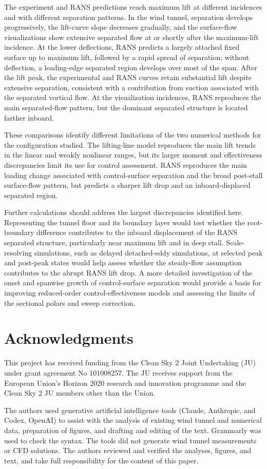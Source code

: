 \documentclass[journal ]{new-aiaa}
\begin{document}
The experiment and RANS predictions reach maximum lift at different incidences and with different separation patterns.
In the wind tunnel, separation develops progressively, the lift-curve slope decreases gradually, and the surface-flow visualizations show extensive separated flow at or shortly after the maximum-lift incidence.
At the lower deflections, RANS predicts a largely attached fixed surface up to maximum lift, followed by a rapid spread of separation; without deflection, a leading-edge separated region develops over most of the span.
After the lift peak, the experimental and RANS curves retain substantial lift despite extensive separation, consistent with a contribution from suction associated with the separated vortical flow.
At the visualization incidences, RANS reproduces the main separated-flow pattern, but the dominant separated structure is located farther inboard.

These comparisons identify different limitations of the two numerical methods for the configuration studied.
The lifting-line model reproduces the main lift trends in the linear and weakly nonlinear ranges, but its larger moment and effectiveness discrepancies limit its use for control assessment.
RANS reproduces the main loading change associated with control-surface separation and the broad post-stall surface-flow pattern, but predicts a sharper lift drop and an inboard-displaced separated region.

Further calculations should address the largest discrepancies identified here.
Representing the tunnel floor and its boundary layer would test whether the root-boundary difference contributes to the inboard displacement of the RANS separated structure, particularly near maximum lift and in deep stall. Scale-resolving simulations, such as delayed detached-eddy simulations, at selected peak and post-peak states would help assess whether the steady-flow assumption contributes to the abrupt RANS lift drop.
A more detailed investigation of the onset and spanwise growth of control-surface separation would provide a basis for improving reduced-order control-effectiveness models and assessing the limits of the sectional polars and sweep correction.

\clearpage

\section*{Acknowledgments}
This project has received funding from the Clean Sky 2 Joint Undertaking (JU) under grant agreement No 101008257. The JU receives support from the European Union’s Horizon 2020 research and innovation programme and the Clean Sky 2 JU members other than the Union.

The authors used generative artificial intelligence tools (Claude, Anthropic, and Codex, OpenAI) to assist with the analysis of existing wind tunnel and numerical data, preparation of figures, and drafting and editing of the text. Grammarly was used to check the syntax. The tools did not generate wind tunnel measurements or CFD solutions. The authors reviewed and verified the analyses, figures, and text, and take full responsibility for the content of this paper.


\end{document}
